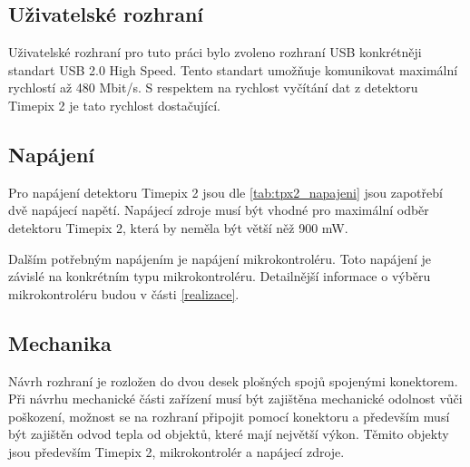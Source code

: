 \subsection{Uživatelské rozhraní}
Uživatelské rozhraní pro tuto práci bylo zvoleno rozhraní USB konkrétněji standart USB 2.0 High Speed. Tento standart umožňuje komunikovat maximální rychlostí až 480 Mbit/s. S respektem na rychlost vyčítání dat z detektoru Timepix 2 je tato rychlost dostačující. 

\subsection{Napájení}
Pro napájení detektoru Timepix 2 jsou dle \ref{tab:tpx2_napajeni} jsou zapotřebí dvě napájecí napětí. Napájecí zdroje musí být vhodné pro maximální odběr detektoru Timepix 2, která by neměla být větší něž 900 mW. 
\par Dalším potřebným napájením je napájení mikrokontroléru. Toto napájení je závislé na konkrétním typu mikrokontroléru. Detailnější informace o výběru mikrokontroléru budou v části \ref{realizace}.

\subsection{Mechanika}
Návrh rozhraní je rozložen do dvou desek plošných spojů spojenými konektorem. Při návrhu mechanické části zařízení musí být zajištěna mechanické odolnost vůči poškození, možnost se na rozhraní připojit pomocí konektoru a především musí být zajištěn odvod tepla od objektů, které mají největší výkon. Těmito objekty jsou především Timepix 2, mikrokontrolér a napájecí zdroje. 


